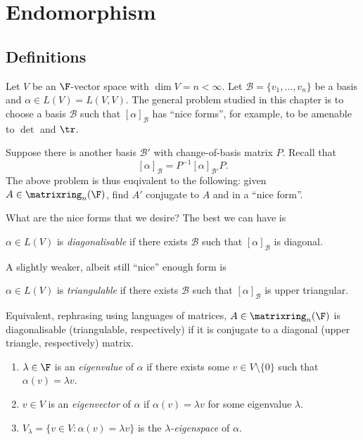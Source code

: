 \documentclass[a4paper]{article}
\newcommand*{\M}{\matrixring}
\newcommand*{\basis}{\mathcal}
\theoremstyle{definition}
\begin{document}
\section{Endomorphism}

\subsection{Definitions}

Let \(V\) be an \(\F\)-vector space with \(\dim V = n < \infty\). Let \(\basis B =\{v_1, \dots, v_n\}\) be a basis and \(\alpha \in L(V) = L(V, V)\). The general problem studied in this chapter is to choose a basis \(\basis B\) such that \([\alpha]_{\basis B}\) has ``nice forms'', for example, to be amenable to \(\det\) and \(\tr\).

Suppose there is another basis \(\basis B'\) with change-of-basis matrix \(P\). Recall that
\[
  [\alpha]_{\basis B} = P^{-1}[\alpha]_{\basis B'}P.
\]
The above problem is thus euqivalent to the following: given \(A \in \M_n(\F)\), find \(A'\) conjugate to \(A\) and in a ``nice form''.

What are the nice forms that we desire? The best we can have is

\begin{definition}[Diagonalisable]
  \(\alpha \in L(V)\) is \emph{diagonalisable} if there exists \(\basis B\) such that \([\alpha]_{\basis B}\) is diagonal.
\end{definition}

A slightly weaker, albeit still ``nice'' enough form is

\begin{definition}[Triangulable]
  \(\alpha \in L(V)\) is \emph{triangulable} if there exists \(\basis B\) such that \([\alpha]_{\basis B}\) is upper triangular.
\end{definition}

Equivalent, rephrasing using languages of matrices, \(A \in \M_n(\F)\) is diagonalisable (triangulable, respectively) if it is conjugate to a diagonal (upper triangle, respectively) matrix.

\begin{definition}\leavevmode
  \begin{enumerate}
  \item \(\lambda \in \F\) is an \emph{eigenvalue} of \(\alpha\) if there exists some \(v \in V\setminus\{0\}\) such that \(\alpha(v) = \lambda v\).
  \item \(v \in V\) is an \emph{eigenvector} of \(\alpha\) if \(\alpha(v) = \lambda v\) for some eigenvalue \(\lambda\).
  \item \(V_\lambda = \{v \in V: \alpha(v) = \lambda v\}\) is the \emph{\(\lambda\)-eigenspace} of \(\alpha\).
  \end{enumerate}
\end{definition}
\end{document}
